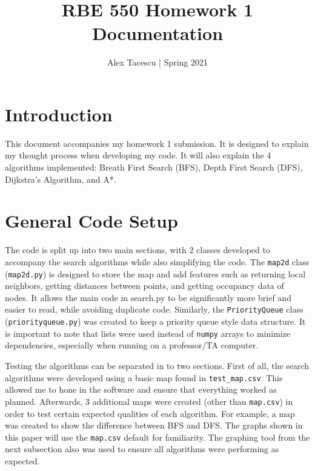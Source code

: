 \documentclass[journal]{IEEEtran}
\title{RBE 550 Homework 1 Documentation}
\author{Alex Tacescu | Spring 2021
}
\begin{document}

    \maketitle

    \section{Introduction}
    This document accompanies my homework 1 submission. It is designed to explain my thought process when developing my code. It will also explain the 4 algorithms implemented: Breath First Search (BFS), Depth First Search (DFS), Dijkstra's Algorithm, and A*.

    \section{General Code Setup}
    The code is split up into two main sections, with 2 classes developed to accompany the search algorithms while also simplifying the code. The \lstinline{map2d} class (\lstinline{map2d.py}) is designed to store the map and add features such as returning local neighbors, getting distances between points, and getting occupancy data of nodes. It allows the main code in search.py to be significantly more brief and easier to read, while avoiding duplicate code. Similarly, the \lstinline{PriorityQueue} class (\lstinline{priorityqueue.py}) was created to keep a priority queue style data structure. It is important to note that lists were used instead of \lstinline{numpy} arrays to minimize dependencies, especially when running on a professor/TA computer.

    Testing the algorithms can be separated in to two sections. First of all, the search algorithms were developed using a basic map found in \lstinline{test_map.csv}. This allowed me to hone in the software and ensure that everything worked as planned. Afterwards, 3 additional maps were created (other than \lstinline{map.csv}) in order to test certain expected qualities of each algorithm. For example, a map was created to show the difference between BFS and DFS. The graphs shown in this paper will use the \lstinline{map.csv} default for familiarity. The graphing tool from the next subsection also was used to ensure all algorithms were performing as expected.
    
\end{document}
